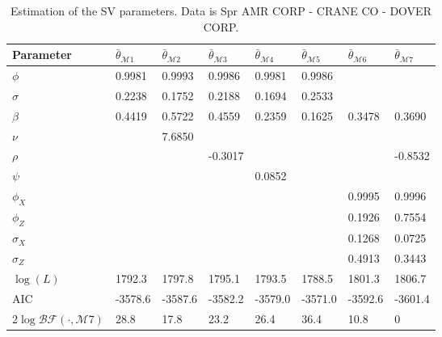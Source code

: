 \documentclass[11pt,a4,twosided,singlespacing,titlepagenumber=on]{scrreprt}
\numberwithin{equation}{chapter} %
\theoremstyle{remark}
\begin{document}
\begin{table}[H]
\centering
\begin{tabular}{llllllll}
Parameter        & $\bar{\theta}_{\mathcal{M}1}$ & $\bar{\theta}_{\mathcal{M}2}$ & $\bar{\theta}_{\mathcal{M}3}$ & $\bar{\theta}_{\mathcal{M}4}$ & $\bar{\theta}_{\mathcal{M}5}$ & $\bar{\theta}_{\mathcal{M}6}$& $\bar{\theta}_{\mathcal{M}7}$\\ 
\hline
$\phi$								                  & 0.9981  & 0.9993 & 0.9986  & 0.9981  & 0.9986 & \\
$\sigma$                                & 0.2238  & 0.1752 & 0.2188  & 0.1694  & 0.2533 & \\
$\beta$                                 & 0.4419  & 0.5722 & 0.4559  & 0.2359  & 0.1625 & 0.3478 & 0.3690\\
$\nu$                                   &         & 7.6850 &         &         &         &\\
$\rho$                                  &         &        & -0.3017 &         &         & & -0.8532\\
$\psi$                                  &         &        &         & 0.0852  &         & \\
$\phi_X$                                &         &        &         &         &         & 0.9995 & 0.9996\\
$\phi_Z$                                &         &        &         &         &         & 0.1926 & 0.7554\\
$\sigma_X$                              &         &        &         &         &         & 0.1268 & 0.0725\\
$\sigma_Z$                              &         &        &         &         &         & 0.4913 & 0.3443\\
$\log(L)$                               & 1792.3  & 1797.8 & 1795.1  & 1793.5  & 1788.5  & 1801.3 & 1806.7\\
AIC                                     & -3578.6 & -3587.6& -3582.2 & -3579.0 & -3571.0 & -3592.6 & -3601.4\\
$2 \log \mathcal{BF}(\cdot, \mathcal{M}7)$& 28.8    & 17.8      & 23.2    & 26.4    & 36.4    & 10.8 & 0 \\
\hline
\end{tabular}
\caption{Estimation of the SV parameters. Data is Spr AMR CORP - CRANE CO - DOVER CORP.}
\label{estimation_of_svm_appl_spr}
\end{table}
\end{document}

